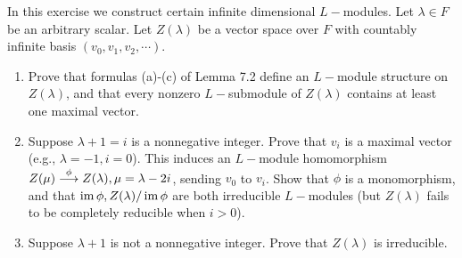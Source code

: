 \begin{ex}\label{7.7}
  In this exercise we construct certain infinite dimensional $L-$modules. Let $\lambda\in F$ be an arbitrary scalar. Let $Z(\lambda)$ be a vector space over $F$ with countably infinite basis $(v_0, v_1, v_2, \cdots )$.
  \begin{enumerate}
    \item Prove that formulas (a)-(c) of Lemma 7.2 define an $L-$module structure on $Z(\lambda)$, and that every nonzero $L-$submodule of $Z(\lambda)$ contains at least one maximal vector.
    \item Suppose $\lambda + 1 = i$ is a nonnegative integer. Prove that $v_i$ is a maximal vector (e.g., $\lambda = -1, i = 0$). This induces an $L-$module homomorphism $Z(\mu)\stackrel{{\phi}}{\longrightarrow}Z(\lambda), \mu = \lambda - 2i$, sending $v_0$ to $v_i$. Show that $\phi$ is a monomorphism, and that $\operatorname{im}\phi, Z(\lambda)/\operatorname{im}\phi$ are both irreducible $L-$modules (but $Z(\lambda)$ fails to be completely reducible when $i > 0$).
    \item Suppose $\lambda + 1$ is not a nonnegative integer. Prove that $Z(\lambda)$ is irreducible.
  \end{enumerate}
\end{ex}
